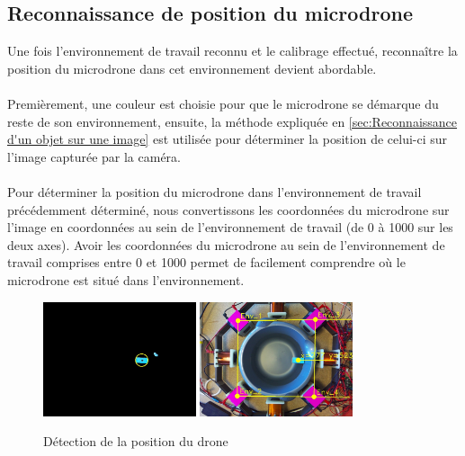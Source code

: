 \documentclass{article}
\begin{document}
    \subsection{Reconnaissance de position du microdrone}
        Une fois l'environnement de travail reconnu et le calibrage effectué, reconnaître la position du microdrone dans cet environnement devient abordable.
        \\\\
        Premièrement, une couleur est choisie pour que le microdrone se démarque du reste de son environnement, ensuite, la méthode expliquée en \ref{sec:Reconnaissance d'un objet sur une image} est utilisée pour déterminer la position de celui-ci sur l'image capturée par la caméra.
        \\\\
        Pour déterminer la position du microdrone dans l'environnement de travail précédemment déterminé, nous convertissons les coordonnées du microdrone sur l'image en coordonnées au sein de l'environnement de travail (de 0 à 1000 sur les deux axes). Avoir les coordonnées du microdrone au sein de l'environnement de travail comprises entre 0 et 1000 permet de facilement comprendre où le microdrone est situé dans l'environnement.

        \begin{figure}[H]
        	\centering
        	\includegraphics[width = 0.4\textwidth]{Images/view_mask_1}
        	\hspace{1cm}
        	\includegraphics[width = 0.4\textwidth]{Images/view_pos}
        	\caption{Détection de la position du drone}
        	\label{ref:Camera drone position detection}
        \end{figure}
\end{document}
